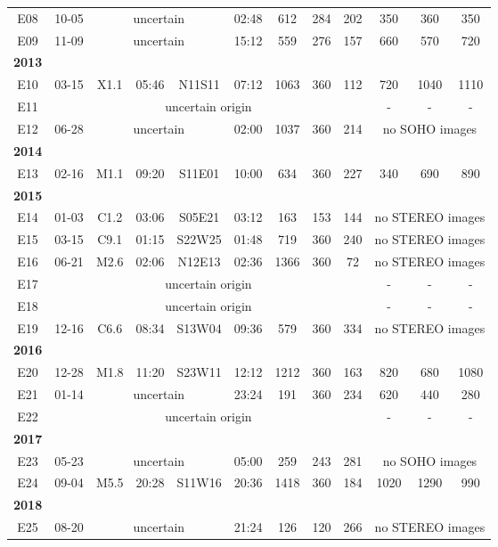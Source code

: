 \begin{table}[!htp]
\begin{adjustbox}{width=\textwidth}
\begin{tabular}{@{}cccccccccccc@{}}
			E08 & 10-05 & \multicolumn{3}{c}{uncertain} & 02:48 & 612 & 284 & 202 & 350 & 360 & 350 \\
			E09 & 11-09 & \multicolumn{3}{c}{uncertain} & 15:12 & 559 & 276 & 157 & 660 & 570 & 720 \\
			\textbf{2013}\\
			E10 & 03-15 & X1.1 & 05:46 & N11S11 & 07:12 & 1063 & 360 & 112 & 720 & 1040 & 1110 \\
			E11 & \multicolumn{8}{c}{uncertain origin} & - & - & -\\
			E12 & 06-28 & \multicolumn{3}{c}{uncertain} & 02:00 & 1037 & 360 & 214 & \multicolumn{3}{c}{no SOHO images}\\
			\textbf{2014} \\
			E13 & 02-16 & M1.1 & 09:20 & S11E01 & 10:00 & 634 & 360 & 227 & 340 & 690 & 890 \\
			\textbf{2015}\\
			E14 & 01-03 & C1.2 & 03:06 & S05E21 & 03:12 & 163 & 153 & 144 & \multicolumn{3}{c}{no STEREO images} \\
			E15 & 03-15 & C9.1 & 01:15 & S22W25 & 01:48 & 719 & 360 & 240 & \multicolumn{3}{c}{no STEREO images} \\
			E16 & 06-21 & M2.6 & 02:06 & N12E13 & 02:36 & 1366 & 360 & 72 & \multicolumn{3}{c}{no STEREO images} \\
			E17 & \multicolumn{8}{c}{uncertain origin} & - & - & - \\
			E18 & \multicolumn{8}{c}{uncertain origin} & - & - & - \\
			E19 & 12-16 & C6.6 & 08:34 & S13W04 & 09:36 & 579 & 360 & 334 & \multicolumn{3}{c}{no STEREO images} \\
			\textbf{2016} \\
			E20 & 12-28 & M1.8 & 11:20 & S23W11 & 12:12 & 1212 & 360 & 163 & 820 & 680 & 1080 \\
			E21 & 01-14 & \multicolumn{3}{c}{uncertain} & 23:24 & 191 & 360 & 234 & 620 & 440 & 280 \\
			E22 & \multicolumn{8}{c}{uncertain origin} & - & - & - \\
			\textbf{2017}\\
			E23 & 05-23 & \multicolumn{3}{c}{uncertain} & 05:00 & 259 & 243 & 281 & \multicolumn{3}{c}{no SOHO images}\\
			E24 & 09-04 & M5.5 & 20:28 & S11W16 & 20:36 & 1418 & 360 & 184 & 1020 & 1290 & 990 \\
			\textbf{2018}\\
			E25 & 08-20 & \multicolumn{3}{c}{uncertain} & 21:24 & 126 & 120 & 266 & \multicolumn{3}{c}{no STEREO images} \\
			\bottomrule
			\end{tabular}
		\end{adjustbox}
	\end{table}

